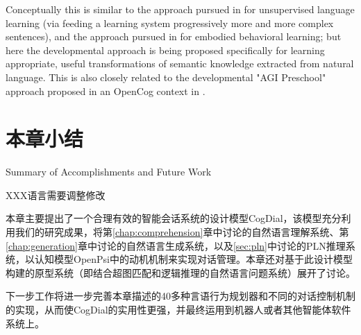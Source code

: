 Conceptually this is similar to the approach
pursued in \cite{Spitkovsky2013} for unsupervised language learning (via feeding a learning system progressively more and more complex
sentences), and the approach pursued in \cite{Goertzel2008w} for embodied behavioral learning; but here the developmental approach
is being proposed specifically for learning appropriate, useful transformations of semantic knowledge extracted from natural language.
This is also closely related to the developmental "AGI Preschool" approach proposed in an OpenCog context in \cite{Goertzel2009a}.



\section{本章小结}{Summary of Accomplishments and Future Work}

XXX语言需要调整修改

本章主要提出了一个合理有效的智能会话系统的设计模型CogDial，该模型充分利用我们的研究成果，将第\ref{chap:comprehension}章中讨论的自然语言理解系统、第\ref{chap:generation}章中讨论的自然语言生成系统，以及\ref{sec:pln}中讨论的PLN推理系统，以认知模型OpenPsi中的动机机制来实现对话管理。本章还对基于此设计模型构建的原型系统（即结合超图匹配和逻辑推理的自然语言问题系统）展开了讨论。

下一步工作将进一步完善本章描述的40多种言语行为规划器和不同的对话控制机制的实现，从而使CogDial的实用性更强，并最终运用到机器人或者其他智能体软件系统上。


